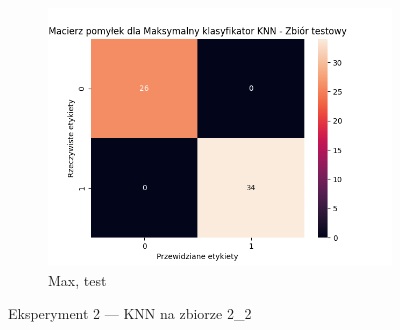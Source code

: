 \documentclass[12pt]{article}
\newcommand*{\subfigwidth}{0.24\textwidth}
\begin{document}
\begin{figure}[H]
\begin{subfigure}[t]{\subfigwidth}
        \includegraphics[width=\linewidth]{img/exp_2/knn/2_2/max/test_matrix.png}
        \caption{Max, test}
    \end{subfigure} 
    
    \caption{Eksperyment 2 --- KNN na zbiorze 2\_2}\label{fig:figure16}
\end{figure}
\end{document}
